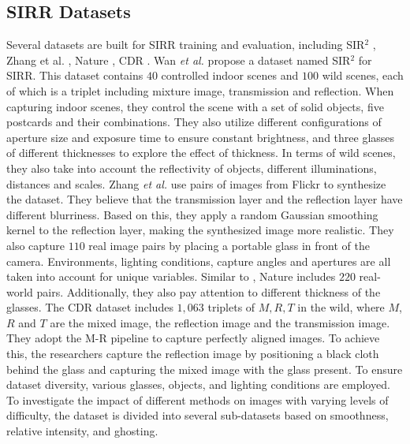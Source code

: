 \documentclass[10pt,journal]{IEEEtran}
\begin{document}
\subsection{SIRR Datasets}
Several datasets are built for SIRR training and evaluation, including SIR$^2$ \cite{wanBenchmarkingSingleimageReflection2017}, Zhang et al. \cite{zhangSingleImageReflection2018}, Nature \cite{liSingleImageReflection2020}, CDR \cite{leiCategorizedReflectionRemoval2022}. 
Wan \textit{et al.} \cite{wanBenchmarkingSingleimageReflection2017} propose a dataset named SIR$^2$ for SIRR. 
This dataset contains $40$ controlled indoor scenes and $100$ wild scenes, each of which is a triplet including mixture image, transmission and reflection. When capturing indoor scenes, they control the scene with a set of solid objects, five postcards and their combinations. They also utilize different configurations of aperture size and exposure time to ensure constant brightness, and three glasses of different thicknesses to explore the effect of thickness. In terms of wild scenes, they also take into account the reflectivity of objects, different illuminations, distances and scales. 
%
Zhang \textit{et al.} \cite{zhangSingleImageReflection2018} use pairs of images from Flickr to synthesize the dataset. They believe that the transmission layer and the reflection layer have different blurriness. Based on this, they apply a random Gaussian smoothing kernel to the reflection layer, making the synthesized image more realistic. They also capture $110$ real image pairs by placing a portable glass in front of the camera. Environments, lighting conditions, capture angles and apertures are all taken into account for unique variables.
%
Similar to \cite{zhangSingleImageReflection2018}, Nature \cite{liSingleImageReflection2020} includes $220$ real-world pairs. Additionally, they also pay attention to different thickness of the glasses. 
%
The CDR dataset \cite{leiCategorizedReflectionRemoval2022} includes $1,063$ triplets of $M, R, T$ in the wild, where $M$, $R$ and $T$ are the mixed image, the reflection image and the transmission image. They adopt the M-R pipeline \cite{leiPolarizedReflectionRemoval2020} to capture perfectly aligned images. 
To achieve this, the researchers capture the reflection image by positioning a black cloth behind the glass and capturing the mixed image with the glass present. To ensure dataset diversity, various glasses, objects, and lighting conditions are employed. To investigate the impact of different methods on images with varying levels of difficulty, the dataset is divided into several sub-datasets based on smoothness, relative intensity, and ghosting.
\end{document}
